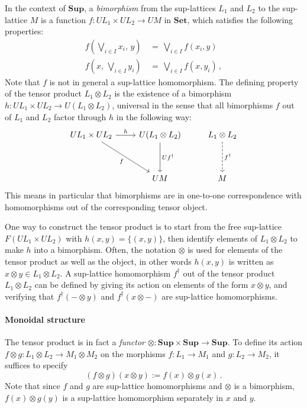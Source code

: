 \documentclass[11pt,oneside]{book}
\theoremstyle{definition}
\begin{document}
In the context of $\mathbf{Sup}$,
a \emph{bimorphism}
from the sup-lattices $L_1$ and $L_2$
to the sup-lattice $M$
is a function $f : U L_1 \times U L_2 \rightarrow U M$
in $\mathbf{Set}$,
which satisfies the following properties:
\begin{align*}
  f(\bigvee_{i \in I} x_i, \, y) \, &= \, \bigvee_{i \in I} f(x_i, y) \\
  f(x, \, \bigvee_{i \in I} y_i) \, &= \, \bigvee_{i \in I} f(x, y_i)
  \,,
\end{align*}
Note that $f$ is not in general
a sup-lattice homomorphism.
The defining property of the tensor product $L_1 \otimes L_2$
is the existence of a bimorphism
$h : U L_1 \times U L_2 \rightarrow U (L_1 \otimes L_2)$,
universal in the sense that all bimorphisms $f$
out of $L_1$ and $L_2$
factor through $h$ in the following way:
\begin{equation} \label{eqn:tensor}
  \begin{tikzcd}[row sep=huge]
    U L_1 \times U L_2 \ar[r, "h"] \ar[dr, "f"'] &
    U (L_1 \otimes L_2) \ar[d, "U f^\dagger"] &
    L_1 \otimes L_2 \ar[d, "f^\dagger", dashed] \\
    & U M & M
  \end{tikzcd}
\end{equation}
This means in particular that
bimorphisms are in one-to-one correspondence with
homomorphisms out of the corresponding tensor object.

One way to construct the tensor product
is to start from the free sup-lattice $F (U L_1 \times U L_2)$
with $h(x, y) = \{ (x, y) \}$,
then identify elements of $L_1 \otimes L_2$
to make $h$ into a bimorphism.
Often, the notation $\otimes$ is used for elements
of the tensor product as well as the object,
in other words $h(x, y)$ is written as
$x \otimes y \in L_1 \otimes L_2$.
A sup-lattice homomorphism $f^\dagger$
out of the tensor product $L_1 \otimes L_2$
can be defined by giving its action on
elements of the form $x \otimes y$,
and verifying that
$f^\dagger(- \otimes y)$ and
$f^\dagger(x \otimes -)$ 
are sup-lattice homomorphisms.


\paragraph{Monoidal structure}

The tensor product is in fact a \emph{functor}
${\otimes} :
 \mathbf{Sup} \times \mathbf{Sup} \rightarrow \mathbf{Sup}$.
To define its action
$f \otimes g : L_1 \otimes L_2 \rightarrow M_1 \otimes M_2$
on the morphisms
$f : L_1 \rightarrow M_1$ and
$g : L_2 \rightarrow M_2$,
it suffices to specify
\[
  (f \otimes g)(x \otimes y) := f(x) \otimes g(x)
  \,.
\]
Note that since $f$ and $g$ are sup-lattice homomorphisms
and $\otimes$ is a bimorphism,
$f(x) \otimes g(y)$
is a sup-lattice homomorphism separately in $x$ and $y$.
\end{document}
